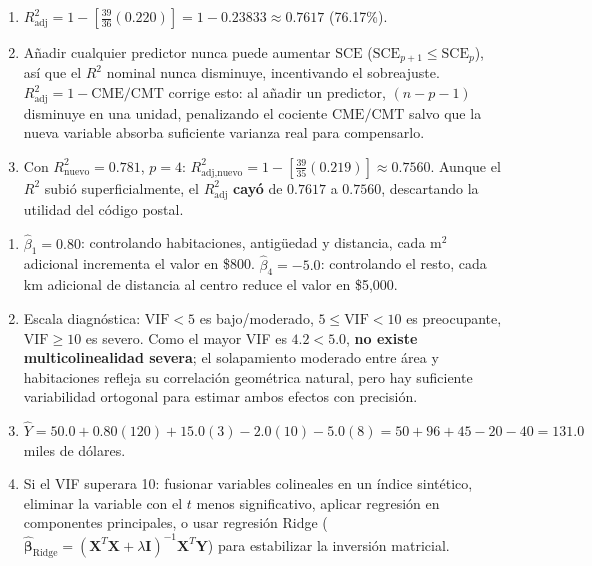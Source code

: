 \begin{solproblema}[prob:9f8863e]
	\begin{enumerate}
		\item $R_{\text{adj}}^2 = 1-\left[\frac{39}{36}(0.220)\right] = 1-0.23833 \approx 0.7617$ (76.17\%).
		\item Añadir cualquier predictor nunca puede aumentar $\text{SCE}$ ($\text{SCE}_{p+1}\le\text{SCE}_p$), así que el $R^2$ nominal nunca disminuye, incentivando el sobreajuste. $R_{\text{adj}}^2 = 1-\text{CME}/\text{CMT}$ corrige esto: al añadir un predictor, $(n-p-1)$ disminuye en una unidad, penalizando el cociente $\text{CME}/\text{CMT}$ salvo que la nueva variable absorba suficiente varianza real para compensarlo.
		\item Con $R^2_{\text{nuevo}}=0.781$, $p=4$: $R_{\text{adj,nuevo}}^2 = 1-\left[\frac{39}{35}(0.219)\right] \approx 0.7560$. Aunque el $R^2$ subió superficialmente, el $R_{\text{adj}}^2$ \textbf{cayó} de $0.7617$ a $0.7560$, descartando la utilidad del código postal.
	\end{enumerate}
\end{solproblema}

\begin{solproblema}[prob:1d085e7]
	\begin{enumerate}
		\item $\hat{\beta}_1=0.80$: controlando habitaciones, antigüedad y distancia, cada m$^2$ adicional incrementa el valor en \$800. $\hat{\beta}_4=-5.0$: controlando el resto, cada km adicional de distancia al centro reduce el valor en \$5,000.
		\item Escala diagnóstica: $\text{VIF}<5$ es bajo/moderado, $5\le\text{VIF}<10$ es preocupante, $\text{VIF}\ge10$ es severo. Como el mayor VIF es $4.2<5.0$, \textbf{no existe multicolinealidad severa}; el solapamiento moderado entre área y habitaciones refleja su correlación geométrica natural, pero hay suficiente variabilidad ortogonal para estimar ambos efectos con precisión.
		\item $\hat{Y} = 50.0+0.80(120)+15.0(3)-2.0(10)-5.0(8) = 50+96+45-20-40 = 131.0$ miles de dólares.
		\item Si el VIF superara 10: fusionar variables colineales en un índice sintético, eliminar la variable con el $t$ menos significativo, aplicar regresión en componentes principales, o usar regresión Ridge ($\hat{\boldsymbol{\beta}}_{\text{Ridge}}=(\mathbf{X}^T\mathbf{X}+\lambda\mathbf{I})^{-1}\mathbf{X}^T\mathbf{Y}$) para estabilizar la inversión matricial.
	\end{enumerate}
\end{solproblema}

